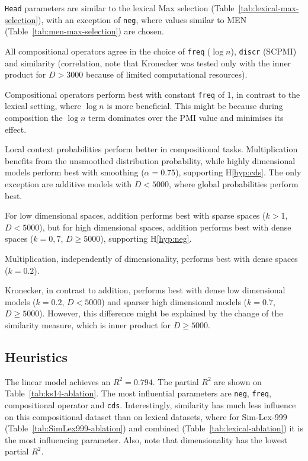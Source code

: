 \texttt{Head} parameters are similar to the lexical Max selection (Table~\ref{tab:lexical-max-selection}), with an exception of \texttt{neg}, where values similar to MEN (Table~\ref{tab:men-max-selection}) are chosen.

All compositional operators agree in the choice of \texttt{freq} ($\log n$), \texttt{discr} (SCPMI) and similarity (correlation, note that Kronecker was tested only with the inner product for $D > 3000$ because of limited computational resources).

Compositional operators perform best with constant \texttt{freq} of 1, in contrast to the lexical setting, where $\log n$ is more beneficial. This might be because during composition the $\log n$ term dominates over the PMI value and minimises its effect.

Local context probabilities perform better in compositional tasks. Multiplication benefits from the unsmoothed distribution probability, while highly dimensional models perform best with smoothing ($\alpha = 0.75$), supporting H\ref{hyp:cds}. The only exception are additive models with $D < 5000$, where global probabilities perform best.

For low dimensional spaces, addition performs best with sparse spaces ($k > 1$, $D < 5000$), but for high dimensional spaces, addition performs best  with dense spaces ($k = 0,7$, $D \geq 5000$), supporting H\ref{hyp:neg}.

Multiplication, independently of dimensionality, performs best with dense spaces ($k = 0.2$).

Kronecker, in contrast to addition, performs best with dense low dimensional models ($k = 0.2$, $D < 5000$) and sparser high dimensional models ($k = 0.7$, $D \geq 5000$). However, this difference might be explained by the change of the similarity measure, which is inner product for $D \geq 5000$.

\subsection{Heuristics}
\label{sec:heuristics}



The linear model achieves an $R^2 = 0.794$. The partial $R^2$ are shown on Table~\ref{tab:ks14-ablation}. The most influential parameters are \texttt{neg}, \texttt{freq}, compositional operator and \texttt{cds}. Interestingly, similarity has much less influence on this compositional dataset than on lexical datasets, where for Sim-Lex-999 (Table~\ref{tab:SimLex999-ablation}) and combined (Table~\ref{tab:lexical-ablation}) it is the most influencing parameter. Also, note that dimensionality has the lowest partial $R^2$.

